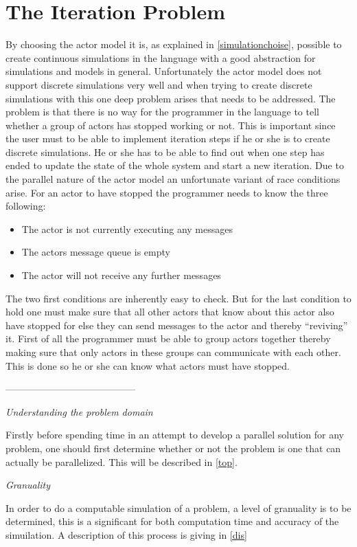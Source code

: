 \section{The Iteration Problem}
By choosing the actor model it is, as explained in \cref{simulationchoise}, possible to create continuous simulations in the language with a good abstraction for simulations and models in general. Unfortunately the actor model does not support discrete simulations very well and when trying to create discrete simulations with this one deep problem arises that needs to be addressed.
The problem is that there is no way for the programmer in the language to tell whether a group of actors has stopped working or not. This is important since the user must to be able to implement iteration steps if he or she is to create discrete simulations. He or she has to be able to find out when one step has ended to update the state of the whole system and start a new iteration. Due to the parallel nature of the actor model an unfortunate variant of race conditions arise.
For an actor to have stopped the programmer needs to know the three following:
\begin{itemize}
\item The actor is not currently executing any messages
\item The actors message queue is empty
\item The actor will not receive any further messages
\end{itemize}
The two first conditions are inherently easy to check. But for the last condition to hold one must make sure that all other actors that know about this actor also have stopped for else they can send messages to the actor and thereby \enquote{reviving} it. First of all the programmer must be able to group actors together thereby making sure that only actors in these groups can communicate with each other. This is done so he or she can know what actors must have stopped.

-----------------------------------------

\emph{Understanding the problem domain}

Firstly before spending time in an attempt to develop a parallel solution for any problem, one should first determine whether or not the problem is one that can actually be parallelized. This will be described in \cref{top}.

\emph{Granuality}

In order to do a computable simulation of a problem, a level of granuality is to be determined, this is a significant for both computation time and accuracy of the simuilation. A description of this process is giving in \cref{dis}

